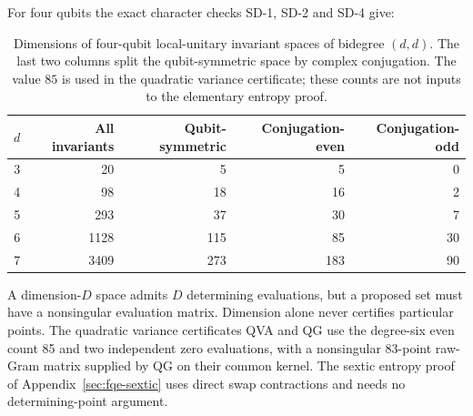 For four qubits the exact character checks SD-1, SD-2 and SD-4 give:

\begin{table}[htbp]
\centering\small
\begin{tabular}{@{}rrrrr@{}}
\toprule
$d$ & All invariants & Qubit-symmetric & Conjugation-even & Conjugation-odd \\
\midrule
3 & 20 & 5 & 5 & 0 \\
4 & 98 & 18 & 16 & 2 \\
5 & 293 & 37 & 30 & 7 \\
6 & 1128 & 115 & 85 & 30 \\
7 & 3409 & 273 & 183 & 90 \\
\bottomrule
\end{tabular}
\caption{Dimensions of four-qubit local-unitary invariant spaces of bidegree $(d,d)$.
The last two columns split the qubit-symmetric space by complex conjugation. The value $85$
is used in the quadratic variance certificate; these counts are not inputs to the elementary entropy proof.}
\label{tab:fqe-invariant-dimensions}
\end{table}

A dimension-\(D\) space admits \(D\) determining evaluations, but a proposed set
must have a nonsingular evaluation matrix. Dimension alone never certifies
particular points. The quadratic variance certificates QVA and QG
use the degree-six even count 85 and two independent zero evaluations, with
a nonsingular 83-point raw-Gram matrix supplied by QG on their common kernel. The sextic entropy proof of Appendix~\ref{sec:fqe-sextic}
uses direct swap contractions and needs no determining-point argument.
